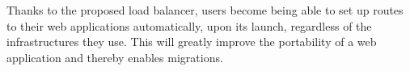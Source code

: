 Thanks to the proposed load balancer, users become being able to set up routes to their web applications automatically, upon its launch, regardless of the infrastructures they use.  
This will greatly improve the portability of a web application and thereby enables migrations.




